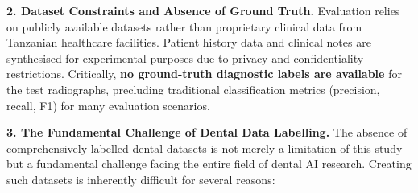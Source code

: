 \documentclass[12pt,a4paper]{report}
\begin{document}
\textbf{2. Dataset Constraints and Absence of Ground Truth.} Evaluation relies on publicly available datasets rather than proprietary clinical data from Tanzanian healthcare facilities. Patient history data and clinical notes are synthesised for experimental purposes due to privacy and confidentiality restrictions. Critically, \textbf{no ground-truth diagnostic labels are available} for the test radiographs, precluding traditional classification metrics (precision, recall, F1) for many evaluation scenarios.

\textbf{3. The Fundamental Challenge of Dental Data Labelling.} The absence of comprehensively labelled dental datasets is not merely a limitation of this study but a fundamental challenge facing the entire field of dental AI research. Creating such datasets is inherently difficult for several reasons:
\end{document}
